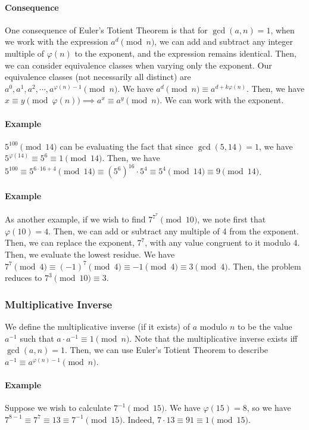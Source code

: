 \documentclass{article}
\begin{document}
\paragraph{Consequence} One consequence of Euler's Totient Theorem is that for $\gcd(a, n) = 1$, when we work with the expression $a^d \pmod n$, we can add and subtract any integer multiple of $\varphi(n)$ to the exponent, and the expression remains identical. Then, we can consider equivalence classes when varying only the exponent. Our equivalence classes (not necessarily all distinct) are $a^0, a^1, a^2, \cdots, a^{\varphi(n)-1} \pmod n$. We have $a^d \pmod n \equiv a^{d + k \varphi(n)}$. Then, we have $x \equiv y \pmod {\varphi(n)} \implies a^x \equiv a^y \pmod n$. We can work with the exponent.
\paragraph{Example} $5^{100} \pmod{14}$ can be evaluating the fact that since $\gcd(5, 14) = 1$, we have $5^{\varphi(14)} \equiv 5^{6} \equiv 1 \pmod{14}$. Then, we have $5^{100} \equiv 5^{6 \cdot 16 + 4} \pmod{14} \equiv (5^6)^{16} \cdot 5^4 \equiv 5^4 \pmod{14} \equiv 9 \pmod{14}$. \paragraph{Example} As another example, if we wish to find $7^{7^7} \pmod{10}$, we note first that $\varphi(10) = 4$. Then, we can add or subtract any multiple of 4 from the exponent. Then, we can replace the exponent, $7^7$, with any value congruent to it modulo 4. Then, we evaluate the lowest residue. We have $7^7 \pmod 4 \equiv (-1)^7 \pmod 4 \equiv -1 \pmod 4 \equiv 3 \pmod 4$. Then, the problem reduces to $7^3 \pmod{10} \equiv 3.$
\subsubsection{Multiplicative Inverse}
We define the multiplicative inverse (if it exists) of $a$ modulo $n$ to be the value $a^{-1}$ such that $a \cdot a^{-1} \equiv 1 \pmod n$. Note that the multiplicative inverse exists iff $\gcd(a, n) = 1$. Then, we can use Euler's Totient Theorem to describe $a^{-1} \equiv a^{\varphi(n) - 1} \pmod n$.
\paragraph{Example} Suppose we wish to calculate $7^{-1} \pmod{15}$. We have $\varphi(15) = 8$, so we have $7^{8-1} \equiv 7^7 \equiv 13 \equiv 7^{-1} \pmod{15}.$ Indeed, $7 \cdot 13 \equiv 91 \equiv 1 \pmod{15}.$
\end{document}
